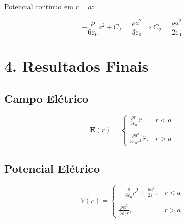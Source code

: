 \documentclass[a4paper,12pt]{article}
\begin{document}
\begin{flushleft}
Potencial contínuo em \( r = a \):

\begin{equation}
-\frac{\rho}{6\varepsilon_0} a^2 + C_2 = \frac{\rho a^2}{3\varepsilon_0}
\Rightarrow \boxed{C_2 = \frac{\rho a^2}{2\varepsilon_0}}
\end{equation}

\section*{4. Resultados Finais}

\subsection*{Campo Elétrico}

\begin{equation}
\mathbf{E}(r) = 
\begin{cases}
\displaystyle \frac{\rho r}{3\varepsilon_0}\, \hat{r}, & r < a \\
\\
\displaystyle \frac{\rho a^3}{3\varepsilon_0 r^2}\, \hat{r}, & r > a
\end{cases}
\end{equation}

\subsection*{Potencial Elétrico}

\begin{equation}
V(r) = 
\begin{cases}
\displaystyle -\frac{\rho}{6\varepsilon_0} r^2 + \frac{\rho a^2}{2\varepsilon_0}, & r < a \\
\\
\displaystyle \frac{\rho a^3}{3\varepsilon_0 r}, & r > a
\end{cases}
\end{equation}
\end{flushleft}
\end{document}
